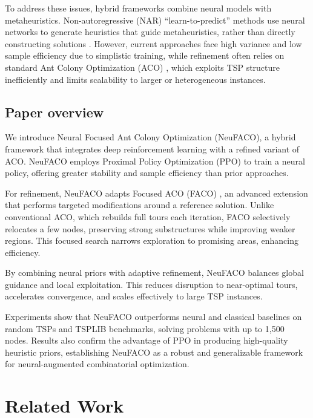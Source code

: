 \documentclass[a4paper,conference]{IEEEtran}
\begin{document}
To address these issues, hybrid frameworks combine neural models with metaheuristics. Non-autoregressive (NAR) “learn-to-predict” methods use neural networks to generate heuristics that guide metaheuristics, rather than directly constructing solutions \cite{DeepACO,RL4CO}. However, current approaches face high variance and low sample efficiency due to simplistic training, while refinement often relies on standard Ant Colony Optimization (ACO) \cite{ACO3}, which exploits TSP structure inefficiently and limits scalability to larger or heterogeneous instances.

\subsection{Paper overview}
We introduce Neural Focused Ant Colony Optimization (NeuFACO), a hybrid framework that integrates deep reinforcement learning with a refined variant of ACO. NeuFACO employs Proximal Policy Optimization (PPO) \cite{PPO} to train a neural policy, offering greater stability and sample efficiency than prior approaches.

For refinement, NeuFACO adapts Focused ACO (FACO) \cite{FACO2022}, an advanced extension that performs targeted modifications around a reference solution. Unlike conventional ACO, which rebuilds full tours each iteration, FACO selectively relocates a few nodes, preserving strong substructures while improving weaker regions. This focused search narrows exploration to promising areas, enhancing efficiency.

By combining neural priors with adaptive refinement, NeuFACO balances global guidance and local exploitation. This reduces disruption to near-optimal tours, accelerates convergence, and scales effectively to large TSP instances.

Experiments show that NeuFACO outperforms neural and classical baselines on random TSPs and TSPLIB benchmarks, solving problems with up to 1,500 nodes. Results also confirm the advantage of PPO in producing high-quality heuristic priors, establishing NeuFACO as a robust and generalizable framework for neural-augmented combinatorial optimization.

\section{Related Work}\label{sec:methods}
\end{document}
